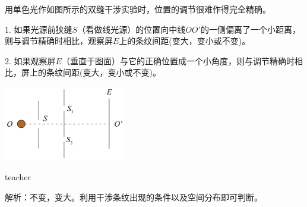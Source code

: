\begin{example}
	用单色光作如图所示的双缝干涉实验时，位置的调节很难作得完全精确。
	
	1. 如果光源前狭缝$S$（看做线光源）的位置向中线$OO'$的一侧偏离了一个小距离，则与调节精确时相比，观察屏$E$上的条纹间距\kong\kong(变大，变小或不变)。
	
	2. 如果观察屏$E$（垂直于图面）与它的正确位置成一个小角度，则与调节精确时相比，屏上的条纹间距\kong\kong(变大，变小或不变)。
	\begin{flushright}
		\includegraphics[width = 0.4\textwidth]{images/wave-optics-5.pdf} 
	\end{flushright}
	\begin{taggedblock}{teacher}
		
		解析：不变，变大。利用干涉条纹出现的条件以及空间分布即可判断。
	\end{taggedblock}
\end{example}

